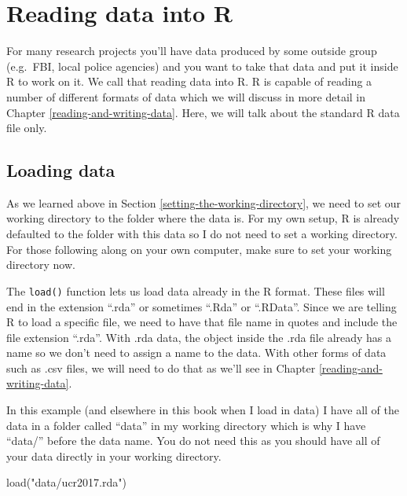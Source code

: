 \documentclass[
]{krantz}
\makeatletter
\newenvironment{Shaded}{\begin{snugshade}}{\end{snugshade}}
\newcommand{\FunctionTok}[1]{\textcolor[rgb]{0,0,0}{#1}}
\newcommand{\NormalTok}[1]{#1}
\newcommand{\StringTok}[1]{\textcolor[rgb]{0.5,0.5,0.5}{#1}}
\newenvironment{kframe}{%
\medskip{}
\setlength{\fboxsep}{.8em}
 \def\at@end@of@kframe{}%
 \ifinner\ifhmode%
  \def\at@end@of@kframe{\end{minipage}}%
  \begin{minipage}{\columnwidth}%
 \fi\fi%
 \def\FrameCommand##1{\hskip\@totalleftmargin \hskip-\fboxsep
 \colorbox{shadecolor}{##1}\hskip-\fboxsep
     \hskip-\linewidth \hskip-\@totalleftmargin \hskip\columnwidth}%
 \MakeFramed {\advance\hsize-\width
   \@totalleftmargin\z@ \linewidth\hsize
   \@setminipage}}%
 {\par\unskip\endMakeFramed%
 \at@end@of@kframe}
\renewenvironment{Shaded}{\begin{kframe}}{\end{kframe}}
\makeatother
\begin{document}
\hypertarget{reading-data-into-r}{%
\section{Reading data into R}\label{reading-data-into-r}}

For many research projects you'll have data produced by some
outside group (e.g.~FBI, local police agencies) and you want
to take that data and put it inside R to work on it. We call
that reading data into R. R is capable of reading a number
of different formats of data which we will discuss in more
detail in Chapter \ref{reading-and-writing-data}. Here, we
will talk about the standard R data file only.

\hypertarget{loading-data-intro}{%
\subsection{Loading data}\label{loading-data-intro}}

As we learned above in Section
\ref{setting-the-working-directory}, we need to set our
working directory to the folder where the data is. For my
own setup, R is already defaulted to the folder with this
data so I do not need to set a working directory. For those
following along on your own computer, make sure to set your
working directory now.

The \texttt{load()} function lets us load data already in
the R format. These files will end in the extension ``.rda''
or sometimes ``.Rda'' or ``.RData''. Since we are telling R
to load a specific file, we need to have that file name in
quotes and include the file extension ``.rda''. With .rda
data, the object inside the .rda file already has a name so
we don't need to assign a name to the data. With other forms
of data such as .csv files, we will need to do that as we'll
see in Chapter \ref{reading-and-writing-data}.

In this example (and elsewhere in this book when I load in
data) I have all of the data in a folder called ``data'' in
my working directory which is why I have ``data/'' before
the data name. You do not need this as you should have all
of your data directly in your working directory.

\begin{Shaded}
\begin{Highlighting}[]
\FunctionTok{load}\NormalTok{(}\StringTok{"data/ucr2017.rda"}\NormalTok{)}
\end{Highlighting}
\end{Shaded}
\end{document}
